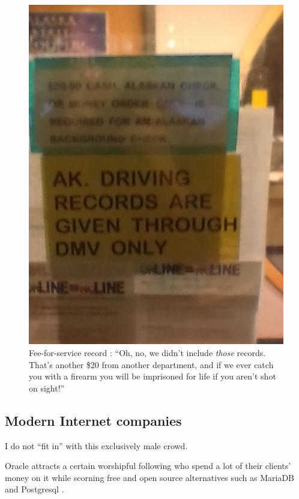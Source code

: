 \documentclass[letterpaper]{article}
\begin{document}
\begin{figure}
\begin{minipage}{0.45\textwidth}
	\includegraphics[width=1.0\textwidth]{IMG_20171206_151246.jpg}
	\end{minipage}
	\caption[Fee-for-service records]{Fee-for-service record \cite{asp2017}: ``Oh, no, we didn't include \textit{those} records.  That's another \$20 from another department, and if we ever catch you with a firearm you will be imprisoned for life if you aren't shot on sight!''}
\end{figure}
\subsection{Modern Internet companies}
I do not ``fit in'' with this exclusively male crowd. 

Oracle \cite{orcl2016} attracts a certain worshipful following who spend a lot of their clients' money on it while scorning free and open source alternatives such as MariaDB \cite{mariadb2016} and Postgresql \cite{postgresql2016}.
\end{document}

